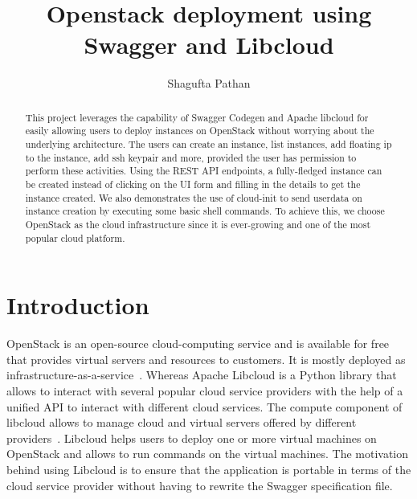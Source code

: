 
\title{Openstack deployment using Swagger and Libcloud}

\author{Shagufta Pathan}

\renewcommand{\shortauthors}{Shagufta}

\begin{abstract}
This project leverages the capability of Swagger Codegen and Apache libcloud 
for easily allowing users to deploy instances on OpenStack without worrying 
about the underlying architecture. The users can create an instance, list 
instances, add floating ip to the instance, add ssh keypair and more, provided 
the user has permission to perform these activities. Using the REST API 
endpoints, a fully-fledged instance can be created instead of clicking on the 
UI form and filling in the details to get the instance created. We also 
demonstrates the use of cloud-init to send userdata on instance creation 
by executing some basic shell commands. To achieve this, we choose 
OpenStack as the cloud infrastructure since it is ever-growing and one of 
the most popular cloud platform.
\end{abstract}


\maketitle
\section{Introduction}
OpenStack is an open-source cloud-computing service and is available for free
that provides virtual servers and resources to customers. It is mostly 
deployed as infrastructure-as-a-service~\cite{hid-sp18-516-www-openstack}. 
Whereas Apache Libcloud is a Python library that allows to interact with 
several popular cloud service providers with the help of a unified API to 
interact with different cloud services. The compute component of libcloud 
allows to manage cloud and virtual servers offered by different 
providers~\cite{hid-sp18-516-www-libcloud}. Libcloud helps users to deploy one 
or more virtual machines on OpenStack and allows to run commands on the 
virtual machines. The motivation behind using Libcloud is to ensure that the 
application is portable in terms of the cloud service provider without having 
to rewrite the Swagger specification file.

